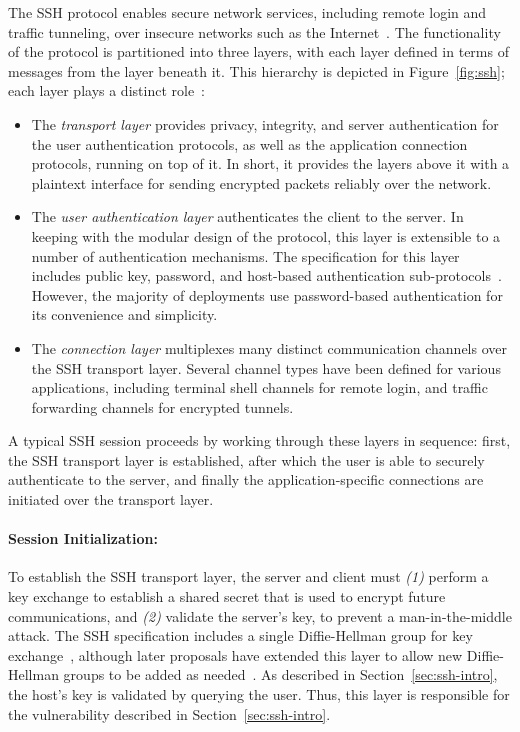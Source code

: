 The SSH protocol enables secure network services, including remote
login and traffic tunneling, over insecure networks such as the
Internet~\cite{rfc4251}. The functionality of the protocol is
partitioned into three layers, with each layer defined in terms of
messages from the layer beneath it. This hierarchy is depicted in
Figure~\ref{fig:ssh}; each layer plays a distinct role~\cite{rfc4251}:
\begin{itemize}
\item The \emph{transport layer} provides privacy, integrity, and
  server authentication for the user authentication protocols, as
  well as the application connection protocols, running on top of
  it. In short, it provides the layers above it with a plaintext
  interface for sending encrypted packets reliably over the network.
\item The \emph{user authentication layer} authenticates the client
  to the server. In keeping with the modular design of the protocol,
  this layer is extensible to a number of authentication
  mechanisms. The specification for this layer includes public key,
  password, and host-based authentication
  sub-protocols~\cite{rfc4252}. However, the majority of deployments
  use password-based authentication for its convenience and
  simplicity.
\item The \emph{connection layer} multiplexes many distinct
  communication channels over the SSH transport layer. Several channel
  types have been defined for various applications, including terminal
  shell channels for remote login, and traffic forwarding channels for
  encrypted tunnels.
\end{itemize}
A typical SSH session proceeds by working through these layers in
sequence: first, the SSH transport layer is established, after which
the user is able to securely authenticate to the server, and finally
the application-specific connections are initiated over the transport
layer.

\paragraph{Session Initialization:}

To establish the SSH transport layer, the server and client must
\textit{(1)} perform a key exchange to establish a shared secret that
is used to encrypt future communications, and \textit{(2)} validate
the server's key, to prevent a man-in-the-middle attack. The SSH
specification includes a single Diffie-Hellman group for key
exchange~\cite{rfc4251}, although later proposals have extended this
layer to allow new Diffie-Hellman groups to be added as
needed~\cite{rfc4419}. As described in Section~\ref{sec:ssh-intro}, the
host's key is validated by querying the user. Thus, this layer is
responsible for the vulnerability described in
Section~\ref{sec:ssh-intro}.

